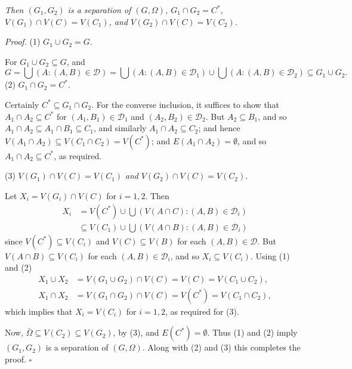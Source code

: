 \textit{Then $(G_1, G_2)$ is a separation of $(G, \Omega)$, $G_1 \cap G_2 = C^*$, $V(G_1) \cap V(C) = V(C_1)$, and $V(G_2) \cap V(C) = V(C_2)$.}

\textit{Proof.} (1) $G_1 \cup G_2 = G.$

For $G_1 \cup G_2 \subseteq G$, and
\begin{equation*}
G = \bigcup (A: (A, B) \in \mathcal{D}) = \bigcup (A: (A, B) \in \mathcal{D}_1) \cup \bigcup (A: (A, B) \in \mathcal{D}_2) \subseteq G_1 \cup G_2.
\end{equation*}
\hspace*{12pt}(2) $G_1 \cap G_2 = C^*.$

Certainly $C^* \subseteq G_1 \cap G_2$. For the converse inclusion, it suffices to show that $A_1 \cap A_2 \subseteq C^*$ for $(A_1, B_1) \in \mathcal{D}_1$ and $(A_2, B_2) \in \mathcal{D}_2$. But $A_2 \subseteq B_1$, and so $A_1 \cap A_2 \subseteq A_1 \cap B_1 \subseteq C_1$, and similarly $A_1 \cap A_2 \subseteq C_2$; and hence $V(A_1 \cap A_2) \subseteq V(C_1 \cap C_2) = V(C^*)$; and $E(A_1 \cap A_2) = \emptyset$, and so $A_1 \cap A_2 \subseteq C^*$, as required.

\hspace*{12pt}(3) $V(G_1) \cap V(C) = V(C_1)$ \textit{and} $V(G_2) \cap V(C) = V(C_2).$

Let $X_i = V(G_i) \cap V(C)$ for $i = 1, 2$. Then
\begin{align*}
X_i &= V(C^*) \cup \bigcup (V(A \cap C): (A, B) \in \mathcal{D}_i) \\
&\subseteq V(C_1) \cup \bigcup (V(A \cap B): (A, B) \in \mathcal{D}_i)
\end{align*}
since $V(C^*) \subseteq V(C_i)$ and $V(C) \subseteq V(B)$ for each $(A, B) \in \mathcal{D}$. But $V(A \cap B) \subseteq V(C_i)$ for each $(A, B) \in \mathcal{D}_i$, and so $X_i \subseteq V(C_i)$. Using (1) and (2)
\begin{align*}
X_1 \cup X_2 &= V(G_1 \cup G_2) \cap V(C) = V(C) = V(C_1 \cup C_2), \\
X_1 \cap X_2 &= V(G_1 \cap G_2) \cap V(C) = V(C^*) = V(C_1 \cap C_2),
\end{align*}
which implies that $X_i = V(C_i)$ for $i = 1, 2$, as required for (3).

Now, $\bar{\Omega} \subseteq V(C_2) \subseteq V(G_2)$, by (3), and $E(C^*) = \emptyset$. Thus (1) and (2) imply $(G_1, G_2)$ is a separation of $(G, \Omega)$. Along with (2) and (3) this completes the proof. $\square$


